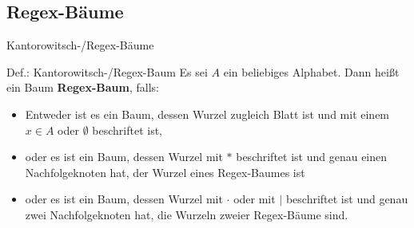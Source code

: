 \subsection{Regex-Bäume}
\begin{frame}{Kantorowitsch-/Regex-Bäume}
    \begin{block}{Def.: Kantorowitsch-/Regex-Baum}
    \small
    	Es sei $A$ ein beliebiges Alphabet. Dann heißt ein Baum \textbf{Regex-Baum}, falls:
    	\begin{itemize}
    		\item Entweder ist es ein Baum, dessen Wurzel zugleich Blatt ist und mit einem $x\in A$ oder $\emptyset$ beschriftet ist,
    		\item oder es ist ein Baum, dessen Wurzel mit $*$ beschriftet ist und genau einen Nachfolgeknoten hat, der Wurzel eines Regex-Baumes ist
    		\item oder es ist ein Baum, dessen Wurzel mit $\cdot$ oder mit $|$ beschriftet ist und genau zwei Nachfolgeknoten hat, die Wurzeln zweier Regex-Bäume sind. 
    	\end{itemize}
    \end{block}


      

\end{frame}

